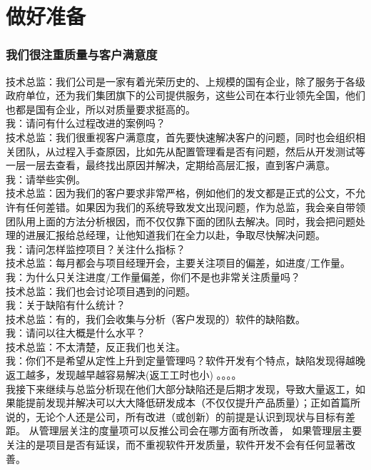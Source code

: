 \chapter{做好准备} %

\hypertarget{ux6211ux4eecux5f88ux6ce8ux91cdux8d28ux91cfux4e0eux5ba2ux6237ux6ee1ux610fux5ea6}{%
\subsection{我们很注重质量与客户满意度}\label{ux6211ux4eecux5f88ux6ce8ux91cdux8d28ux91cfux4e0eux5ba2ux6237ux6ee1ux610fux5ea6}}

技术总监：我们公司是一家有着光荣历史的、上规模的国有企业，除了服务于各级政府单位，还为我们集团旗下的公司提供服务，这些公司在本行业领先全国，他们也都是国有企业，所以对质量要求挺高的。\\
我：请问有什么过程改进的案例吗？\\
技术总监：我们很重视客户满意度，首先要快速解决客户的问题，同时也会组织相关团队，从过程入手查原因，比如先从配置管理看是否有问题，然后从开发测试等一层一层去查看，最终找出原因并解决，定期给高层汇报，直到客户满意。\\
我：请举些实例。\\
技术总监：因为我们的客户要求非常严格，例如他们的发文都是正式的公文，不允许有任何差错。如果因为我们的系统导致发文出现问题，作为总监，我会亲自带领团队用上面的方法分析根因，而不仅仅靠下面的团队去解决。同时，我会把问题处理的进展汇报给总经理，让他知道我们在全力以赴，争取尽快解决问题。\\
我：请问怎样监控项目？关注什么指标？\\
技术总监：每月都会与项目经理开会，主要关注项目的偏差，如进度/工作量。\\
我：为什么只关注进度/工作量偏差，你们不是也非常关注质量吗？\\
技术总监：我们也会讨论项目遇到的问题。\\
我：关于缺陷有什么统计？\\
技术总监：有的，我们会收集与分析（客户发现的）软件的缺陷数。\\
我：请问以往大概是什么水平？\\
技术总监：不太清楚，反正我们也关注。\\
我：你们不是希望从定性上升到定量管理吗？软件开发有个特点，缺陷发现得越晚返工越多，发现越早越容易解决(返工工时也小)
。。。。\\
我接下来继续与总监分析现在他们大部分缺陷还是后期才发现，导致大量返工，如果能提前发现并解决可以大大降低研发成本（不仅仅提升产品质量）；正如首篇所说的，无论个人还是公司，所有改进（或创新）的前提是认识到现状与目标有差距。
从管理层关注的度量项可以反推公司会在哪方面有所改善，
如果管理层主要关注的是项目是否有延误，而不重视软件开发质量，软件开发不会有任何显著改善。

